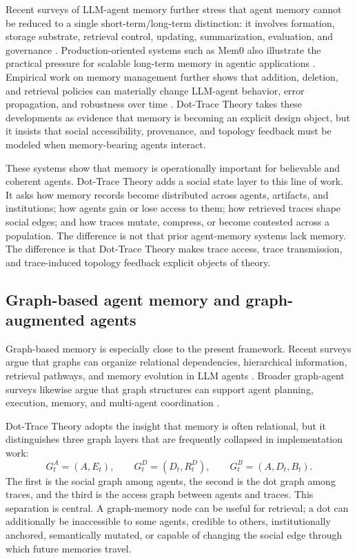 \documentclass[11pt]{article}
\theoremstyle{remark}
\begin{document}
Recent surveys of LLM-agent memory further stress that agent memory cannot be reduced to a single short-term/long-term distinction: it involves formation, storage substrate, retrieval control, updating, summarization, evaluation, and governance \citep{zhang2024memorysurvey,hu2025memoryage,luo2026storageexperience}. Production-oriented systems such as Mem0 also illustrate the practical pressure for scalable long-term memory in agentic applications \citep{mem02025}. Empirical work on memory management further shows that addition, deletion, and retrieval policies can materially change LLM-agent behavior, error propagation, and robustness over time \citep{xiong2025memorymanagement}. Dot-Trace Theory takes these developments as evidence that memory is becoming an explicit design object, but it insists that social accessibility, provenance, and topology feedback must be modeled when memory-bearing agents interact.


These systems show that memory is operationally important for believable and coherent agents. Dot-Trace Theory adds a social state layer to this line of work. It asks how memory records become distributed across agents, artifacts, and institutions; how agents gain or lose access to them; how retrieved traces shape social edges; and how traces mutate, compress, or become contested across a population. The difference is not that prior agent-memory systems lack memory. The difference is that Dot-Trace Theory makes trace access, trace transmission, and trace-induced topology feedback explicit objects of theory.

\subsection{Graph-based agent memory and graph-augmented agents}\label{graph-based-agent-memory}

Graph-based memory is especially close to the present framework. Recent surveys argue that graphs can organize relational dependencies, hierarchical information, retrieval pathways, and memory evolution in LLM agents \citep{yang2026graphmemory}. Broader graph-agent surveys likewise argue that graph structures can support agent planning, execution, memory, and multi-agent coordination \citep{bei2025graphsmeet,liu2025graphaugmented}.

Dot-Trace Theory adopts the insight that memory is often relational, but it distinguishes three graph layers that are frequently collapsed in implementation work:
\[
G^A_t=(A,E_t),\qquad G^D_t=(D_t,R_t^D),\qquad G^B_t=(A,D_t,B_t).
\]
The first is the social graph among agents, the second is the dot graph among traces, and the third is the access graph between agents and traces. This separation is central. A graph-memory node can be useful for retrieval; a dot can additionally be inaccessible to some agents, credible to others, institutionally anchored, semantically mutated, or capable of changing the social edge through which future memories travel.
\end{document}
